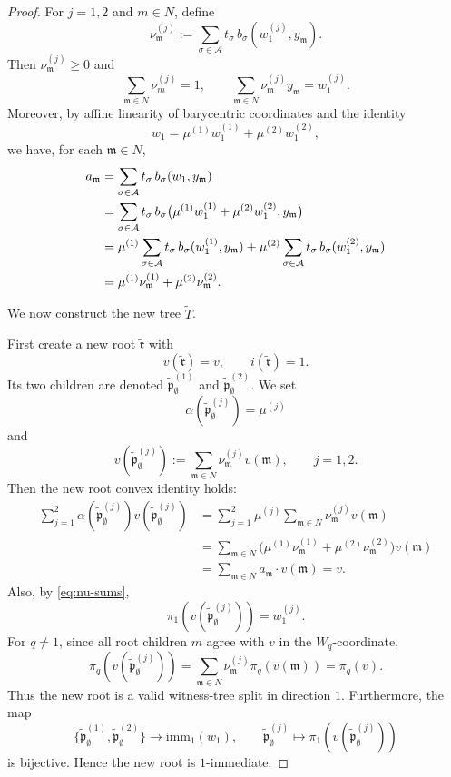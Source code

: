 \documentclass[10pt,a4paper]{amsart}
\newcommand{\fm}{\mathfrak{m}}
\newcommand{\fp}{\mathfrak{p}}
\newcommand{\fr}{\mathfrak{r}}
\let\geq\geqslant
\providecommand{\imm}[0]{\ensuremath{\mathrm{imm}}\xspace}
\let\geq\geqslant
\begin{document}
\begin{proof}
For $j=1,2$ and $m\in N$, define
\begin{equation}\label{eq:nu-def}
  \nu_\fm^{(j)}
  :=
  \sum_{\sigma\in\mathcal A}
  t_\sigma\, b_\sigma(w_1^{(j)},y_\fm).
\end{equation}
Then $\nu_\fm^{(j)}\geq 0$ and
\begin{equation}\label{eq:nu-sums}
  \sum_{\fm\in N}\nu_m^{(j)}=1,\qquad
  \sum_{\fm\in N}\nu_\fm^{(j)}y_\fm=w_1^{(j)}.
\end{equation}
Moreover, by affine linearity of barycentric coordinates and the
identity
\[
  w_1=\mu^{(1)}w_1^{(1)}+\mu^{(2)}w_1^{(2)},
\]
we have, for each $\fm\in N$,
\begin{align}
  a_\fm
  &=
  \sum_{\sigma\in\mathcal A}
  t_\sigma\,b_\sigma(w_1,y_\fm) \notag\\
  &=
  \sum_{\sigma\in\mathcal A}
  t_\sigma\,
  b_\sigma\bigl(\mu^{(1)}w_1^{(1)}+\mu^{(2)}w_1^{(2)},y_\fm\bigr)
  \notag\\
  &=
  \mu^{(1)}
  \sum_{\sigma\in\mathcal A}
  t_\sigma\,b_\sigma(w_1^{(1)},y_\fm)
  +
  \mu^{(2)}
  \sum_{\sigma\in\mathcal A}
  t_\sigma\,b_\sigma(w_1^{(2)},y_\fm) \notag\\
  &=
  \mu^{(1)}\nu_\fm^{(1)}+\mu^{(2)}\nu_\fm^{(2)}.
  \label{eq:a-nu}
\end{align}

We now construct the new tree $\widetilde T$.

First create a new root $\widetilde{\fr}$ with
\[
  v(\widetilde{\fr})=v,\qquad i(\widetilde{\fr})=1.
\]
Its two children are denoted $\widetilde{\fp}^{(1)}_{\emptyset}$ and
$\widetilde{\fp}^{(2)}_{\emptyset}$.  We set
\[
  \alpha(\widetilde{\fp}^{(j)}_{\emptyset})=\mu^{(j)}
\]
and
\begin{equation}\label{eq:root-child-value}
  v(\widetilde{\fp}^{(j)}_{\emptyset})
  :=
  \sum_{\fm\in N}\nu_\fm^{(j)}v(\fm),
  \qquad j=1,2.
\end{equation}
Then the new root convex identity holds:
\begin{align*}
  \sum_{j=1}^2 \alpha(\widetilde{\fp}^{(j)}_{\emptyset})
  v(\widetilde{\fp}^{(j)}_{\emptyset})
  &=
  \sum_{j=1}^2 \mu^{(j)}
  \sum_{\fm\in N}\nu_\fm^{(j)}v(\fm)  \\
  &=
  \sum_{\fm\in N}
  \bigl(\mu^{(1)}\nu_\fm^{(1)}+\mu^{(2)}\nu_\fm^{(2)}\bigr)v(\fm) \\
  &=
  \sum_{\fm\in N}a_\fm \cdot v(\fm)=v.
\end{align*}
Also, by \eqref{eq:nu-sums},
\[
  \pi_1(v(\widetilde{\fp}^{(j)}_{\emptyset}))=w_1^{(j)}.
\]
For $q\neq 1$, since all root children $m$ agree with $v$ in the
$W_q$-coordinate,
\[
  \pi_q(v(\widetilde{\fp}^{(j)}_{\emptyset}))
  =
  \sum_{\fm\in N}\nu_\fm^{(j)}\pi_q(v(\fm))
  =
  \pi_q(v).
\]
Thus the new root is a valid witness-tree split in direction $1$.
Furthermore, the map
\[
  \{\widetilde{\fp}^{(1)}_{\emptyset},\widetilde{\fp}^{(2)}_{\emptyset}\}
  \longrightarrow
  \imm_1(w_1),
  \qquad
  \widetilde{\fp}^{(j)}_{\emptyset}\longmapsto
  \pi_1(v(\widetilde{\fp}^{(j)}_{\emptyset}))
\]
is bijective. Hence the new root is $1$-immediate.


\end{proof}
\end{document}
